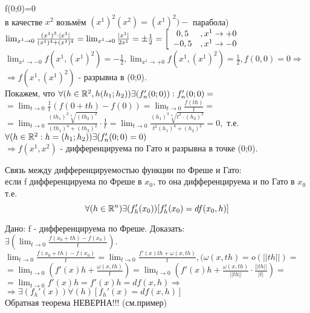 f(0;0)=0
\\
в качестве $x^2$ возьмём $(x^1)^2 (x^2)=(x^1)^2)-$ парабола)
\\
$\lim_{x^1\to 0}\frac{(x^1)^3\cdot |x^1|}{(x^1)^4+(x^1)^4}=\lim_{x^1\to 0}\frac{|x^1|}{2x^1}=\pm\frac{1}{2}=\left[\begin{array}{c c}
0,5 & ,x^1\to +0 \\
-0,5 & ,x^1\to -0
\end{array}\right.$
\\
$\lim_{x^1\to -0} f(x^1,(x^1)^2)=-\frac{1}{2}, \lim_{x^1\to +0} f(x^1,(x^1)^2)=\frac{1}{2}, f(0,0)=0\Rightarrow$
\\
$\Rightarrow f(x^1,(x^1)^2)$ - разрывна в (0;0).
\\
Покажем, что $\forall(h\in \mathbb{R}^2, h(h_1;h_2))\exists(f_n'(0;0)):f_n'(0;0) = $
\\
$ = \lim_{t\to 0}\frac{1}{t}(f(0+th)-f(0))=\lim_{t\to 0}\frac{f(th)}{t} = $
\\
$ = \lim_{t\to 0}\frac{(th_1)^3\sqrt[4]{(th_2)^2}}{(th_1)^4+(th_2)^2}\cdot \frac{1}{t} = \lim_{t\to 0}\frac{(h_1)^3\sqrt[4]{t^2\cdot (h_2)^2}}{t^2(h_1)^4+(h_2)^2}=0,$ т.е.
\\
$\forall(h\in\mathbb{R}^2:h=(h_1;h_2))\exists(f_n'(0;0)=0)$
\\
$\Rightarrow f(x^1,x^2)$ - дифференцируема по Гато и разрывна в точке (0;0).

\begin{teorema}
Связь между дифференцируемостью функции по Фреше и Гато:
\\
если f дифференцируема по Фреше в $x_0$, то она дифференцируема и по Гато в $x_0$ т.е.
$$
\forall(h\in\mathbb{R}^n)\exists(f_h'(x_0))[f_h'(x_0)=df(x_0,h)]
$$
\end{teorema}
\dokvo
Дано: f - дифференцируема по Фреше. Доказать: 
\\
$\exists(\lim_{t\to 0}\frac{f(x_0+th)-f(x_0)}{t}).$
\\
$\lim_{t\to 0}\frac{f(x_0+th)-f(x_0)}{t}=\lim_{t\to 0}\frac{f'(x)th+\omega(x,th)}{t}, (\omega(x,th)=o(||th||)=$
\\
$
= \lim_{t\to 0}(f'(x)h+\frac{\omega(x,th)}{t})=\lim_{t\to 0}(f'(x)h+\frac{\omega(x,th)}{||th||}\cdot\frac{||th||}{|t|})=
$
\\
$
= \lim_{t\to 0}f'(x)h=f'(x)h=df(x,h)\Rightarrow
$
\\
$
\Rightarrow\exists(f_h'(x))\forall(h)[f_h'(x)=df(x,h)]
$
\\
\dokno
Обратная теорема НЕВЕРНА!!! (см.пример)










